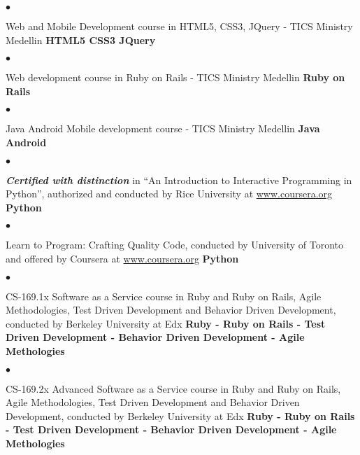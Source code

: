 \documentclass[a4paper]{article}
\newenvironment{achievements}{\begin{list}{$\bullet$}{\topsep 0pt \itemsep
      -2pt}}{\vspace*{4pt}\end{list}}
\newcommand{\programming}[1]{{\textbf{#1}}}
\newcommand{\emphasys}[1]{\textbf{\emph{#1}}}
\begin{document}
\begin{achievements}
\item Web and Mobile Development course in HTML5, CSS3, JQuery - TICS Ministry Medellin
\programming{ HTML5 CSS3 JQuery }
\end{achievements}

\begin{achievements}
\item{Web development course in Ruby on Rails - TICS Ministry Medellin}
\programming{Ruby on Rails}
\end{achievements}

\begin{achievements}
\item{Java Android Mobile development course - TICS Ministry Medellin}
\programming{Java Android}
\end{achievements}

\begin{achievements}
\item{\emphasys{Certified with distinction} in “An Introduction to Interactive Programming in Python”, authorized and conducted by Rice University at \url{www.coursera.org}}
\programming{Python}
\end{achievements}

\begin{achievements}
\item{Learn to Program: Crafting Quality Code, conducted by University of Toronto and offered by Coursera at \url{www.coursera.org}}
\programming{Python}
\end{achievements}

\begin{achievements}
\item{CS-169.1x Software as a Service course in Ruby and Ruby on Rails, Agile Methodologies, Test Driven Development and Behavior Driven Development, conducted by Berkeley University at Edx}
\programming{Ruby - Ruby on Rails - Test Driven Development - Behavior Driven Development - Agile Methologies}
\end{achievements}

\begin{achievements}
\item{CS-169.2x Advanced Software as a Service course in Ruby and Ruby on Rails, Agile Methodologies, Test Driven Development and Behavior Driven Development, conducted by Berkeley University at Edx}
\programming{Ruby - Ruby on Rails - Test Driven Development - Behavior Driven Development - Agile Methologies}
\end{achievements}
\end{document}
